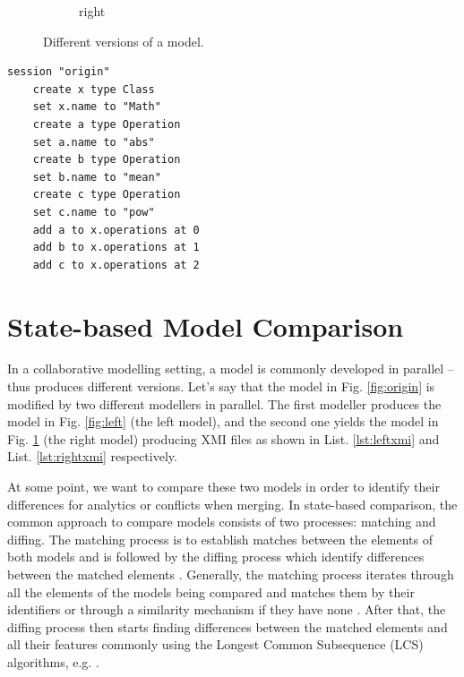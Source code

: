 \documentclass{jot}
\begin{document}
\begin{minipage}[t]{0.59\linewidth}
\begin{figure}[H]
\begin{subfigure}[t]{0.2\linewidth}
            \caption{right}
            \label{fig:right}
        \end{subfigure}
        \hfill
        \label{fig:versions}
        \caption{Different versions of a model.}
    \end{figure}
\end{minipage}
\hfill
\begin{minipage}[t]{0.39\linewidth}
    \begin{lstlisting}[style=eol,caption={The pseudo-formatted CBP of the model in Fig. \ref{fig:origin}.},label=lst:origincbp]
    session "origin"
    create x type Class
    set x.name to "Math" 
    create a type Operation
    set a.name to "abs" 
    create b type Operation
    set b.name to "mean" 
    create c type Operation
    set c.name to "pow" 
    add a to x.operations at 0
    add b to x.operations at 1
    add c to x.operations at 2
    \end{lstlisting}
\end{minipage}

\vspace{-5pt}
\section{State-based Model Comparison}
\label{sec:model_comparison}

\vspace{-5pt}
In a collaborative modelling setting, a model is commonly developed in parallel -- thus produces different versions. Let's say that the model in Fig. \ref{fig:origin} is modified by two different modellers in parallel. The first modeller produces the model in Fig. \ref{fig:left} (the left model), and the second one yields the model in Fig. \ref{fig:right} (the right model) producing XMI files as shown in List. \ref{lst:leftxmi} and List. \ref{lst:rightxmi} respectively.

At some point, we want to compare these two models in order to identify their differences for analytics or conflicts when merging. In state-based comparison, the common approach to compare models consists of two processes: matching and diffing. The matching process is to establish matches between the elements of both models and is followed by the diffing process which identify differences between the matched elements \cite{DBLP:conf/sfm/BroschKLSWW12,emfcompare2018developer}. Generally, the matching process iterates through all the elements of the models being compared and matches them by their identifiers or through a similarity mechanism if they have none \cite{DBLP:conf/sfm/BroschKLSWW12,emfcompare2018developer}. After that, the diffing process then starts finding differences between the matched elements and all their features commonly using the Longest Common Subsequence (LCS) algorithms, e.g. \cite{DBLP:journals/algorithmica/Meyers86}. 
\end{document}
